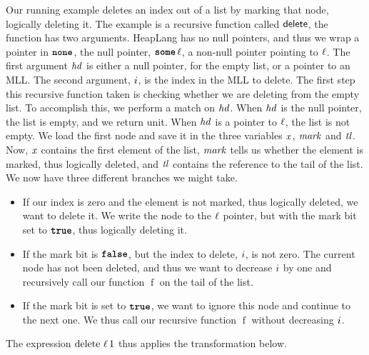 \documentclass[thesis.tex]{subfiles}
\begin{document}
Our running example deletes an index out of a list by marking that node, logically deleting it.
\MLLDeleteProg
The example is a recursive function called $\textsf{\upshape delete}$, the function has two arguments. HeapLang has no null pointers, and thus we wrap a pointer in $\operatorname{\texttt{\upshape \bfseries none}}$, the null pointer, $\operatorname{\texttt{\upshape \bfseries some}} \ell$, a non-null pointer pointing to $\ell$. The first argument $\mathit{hd}$ is either a null pointer, for the empty list, or a pointer to an MLL. The second argument, $i$, is the index in the MLL to delete. The first step this recursive function taken is checking whether we are deleting from the empty list. To accomplish this, we perform a match on $\mathit{hd}$. When $\mathit{hd}$ is the null pointer, the list is empty, and we return unit. When $\mathit{hd}$ is a pointer to $\ell$, the list is not empty. We load the first node and save it in the three variables $\mathit{x}$, $\mathit{mark}$ and $\mathit{tl}$. Now, $\mathit{x}$ contains the first element of the list, $\mathit{mark}$ tells us whether the element is marked, thus logically deleted, and $\mathit{tl}$ contains the reference to the tail of the list. We now have three different branches we might take.
\begin{itemize}
    \item If our index is zero and the element is not marked, thus logically deleted, we want to delete it. We write the node to the $\ell$ pointer, but with the mark bit set to $\texttt{\upshape \bfseries true}$, thus logically deleting it.
    \item If the mark bit is $\texttt{\upshape \bfseries false}$, but the index to delete, $i$, is not zero. The current node has not been deleted, and thus we want to decrease $i$ by one and recursively call our function $\operatorname{f}$ on the tail of the list.
    \item If the mark bit is set to $\texttt{\upshape \bfseries true}$, we want to ignore this node and continue to the next one. We thus call our recursive function $\operatorname{f}$ without decreasing $i$.
\end{itemize}
The expression $\operatorname{delete}\, \ell\, 1$ thus applies the transformation below.
\end{document}
